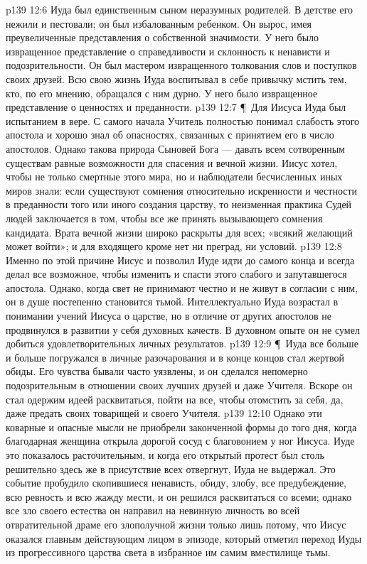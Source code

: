 \vs p139 12:6 Иуда был единственным сыном неразумных родителей. В детстве его нежили и пестовали; он был избалованным ребенком. Он вырос, имея преувеличенные представления о собственной значимости. У него было извращенное представление о справедливости и склонность к ненависти и подозрительности. Он был мастером извращенного толкования слов и поступков своих друзей. Всю свою жизнь Иуда воспитывал в себе привычку мстить тем, кто, по его мнению, обращался с ним дурно. У него было извращенное представление о ценностях и преданности.
\vs p139 12:7 \P\ Для Иисуса Иуда был испытанием в вере. С самого начала Учитель полностью понимал слабость этого апостола и хорошо знал об опасностях, связанных с принятием его в число апостолов. Однако такова природа Сыновей Бога --- давать всем сотворенным существам равные возможности для спасения и вечной жизни. Иисус хотел, чтобы не только смертные этого мира, но и наблюдатели бесчисленных иных миров знали: если существуют сомнения относительно искренности и честности в преданности того или иного создания царству, то неизменная практика Судей людей заключается в том, чтобы все же принять вызывающего сомнения кандидата. Врата вечной жизни широко раскрыты для всех; «всякий желающий может войти»; и для входящего кроме  нет ни преград, ни условий.
\vs p139 12:8 Именно по этой причине Иисус и позволил Иуде идти до самого конца и всегда делал все возможное, чтобы изменить и спасти этого слабого и запутавшегося апостола. Однако, когда свет не принимают честно и не живут в согласии с ним, он в душе постепенно становится тьмой. Интеллектуально Иуда возрастал в понимании учений Иисуса о царстве, но в отличие от других апостолов не продвинулся в развитии у себя духовных качеств. В духовном опыте он не сумел добиться удовлетворительных личных результатов.
\vs p139 12:9 \P\ Иуда все больше и больше погружался в личные разочарования и в конце концов стал жертвой обиды. Его чувства бывали часто уязвлены, и он сделался непомерно подозрительным в отношении своих лучших друзей и даже Учителя. Вскоре он стал одержим идеей расквитаться, пойти на все, чтобы отомстить за себя, да, даже предать своих товарищей и своего Учителя.
\vs p139 12:10 Однако эти коварные и опасные мысли не приобрели законченной формы до того дня, когда благодарная женщина открыла дорогой сосуд с благовонием у ног Иисуса. Иуде это показалось расточительным, и когда его открытый протест был столь решительно здесь же в присутствие всех отвергнут, Иуда не выдержал. Это событие пробудило скопившиеся ненависть, обиду, злобу, все предубеждение, всю ревность и всю жажду мести, и он решился расквитаться со всеми; однако все зло своего естества он направил на невинную личность во всей отвратительной драме его злополучной жизни только лишь потому, что Иисус оказался главным действующим лицом в эпизоде, который отметил переход Иуды из прогрессивного царства света в избранное им самим вместилище тьмы.
